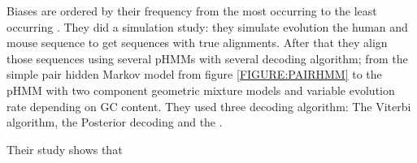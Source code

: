 Biases are ordered by their frequency from the most occurring to the least
occurring \cite{Lunter2008}. They did a simulation study: they simulate
evolution the human and mouse sequence to get sequences with true alignments.
After that they align those sequences using several pHMMs with several decoding
algorithm; from the simple pair hidden Markov model from figure
\ref{FIGURE:PAIRHMM} to the pHMM with two component geometric mixture models and
variable evolution rate depending on GC content. They used three decoding
algorithm: The Viterbi algorithm, the Posterior decoding and the
.

%

Their study shows that 
